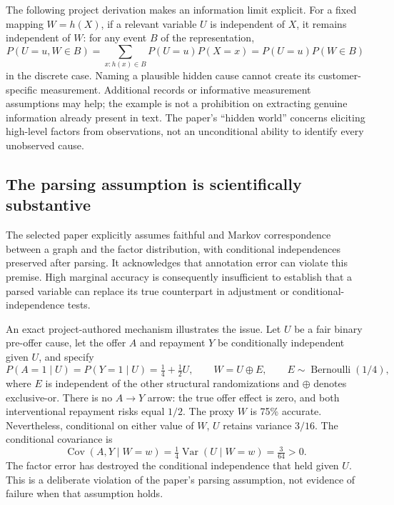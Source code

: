 The following project derivation makes an information limit explicit.
For a fixed mapping $W=h(X)$, if a
relevant variable $U$ is independent of $X$, it remains independent of $W$:
for any event $B$ of the representation,
\begin{equation}
 P(U=u,W\in B)
 =\sum_{x:h(x)\in B}P(U=u)P(X=x)
 =P(U=u)P(W\in B)
 \label{exec19:coat-information}
\end{equation}
in the discrete case. Naming a plausible hidden cause cannot create its
customer-specific measurement. Additional records or informative measurement
assumptions may help; the example is not a prohibition on extracting genuine
information already present in text. The paper's ``hidden world'' concerns
eliciting high-level factors from observations, not an unconditional ability
to identify every unobserved cause.\citep{exec19_coat}

\subsection{The parsing assumption is scientifically substantive}
\label{exec19:coat-parsing}
The selected paper explicitly assumes faithful and Markov correspondence
between a graph and the factor distribution, with conditional independences
preserved after parsing. It acknowledges that annotation error can violate
this premise. High marginal accuracy is consequently insufficient to establish
that a parsed variable can replace its true counterpart in adjustment or
conditional-independence tests.\citep{exec19_coat}

An exact project-authored mechanism illustrates the issue. Let $U$ be a fair
binary pre-offer cause, let the offer $A$ and repayment $Y$ be conditionally
independent given $U$, and specify
\begin{equation}
 P(A=1\mid U)=P(Y=1\mid U)=\tfrac14+\tfrac12U,
 \qquad W=U\mathbin{\oplus}E,
 \qquad E\sim\operatorname{Bernoulli}(1/4),
 \label{exec19:coat-noise-law}
\end{equation}
where $E$ is independent of the other structural randomizations and $\oplus$
denotes exclusive-or. There is no $A\to Y$ arrow: the true offer effect is
zero, and both interventional repayment risks equal $1/2$. The proxy $W$ is
75\% accurate. Nevertheless, conditional on either value of $W$, $U$ retains
variance $3/16$. The conditional covariance is
\begin{equation}
 \operatorname{Cov}(A,Y\mid W=w)
 =\tfrac14\operatorname{Var}(U\mid W=w)=\tfrac3{64}>0.
 \label{exec19:coat-covariance}
\end{equation}
The factor error has destroyed the conditional independence that held given
$U$. This is a deliberate violation of the paper's parsing assumption, not
evidence of failure when that assumption holds.\citep{exec19_coat_reference}

